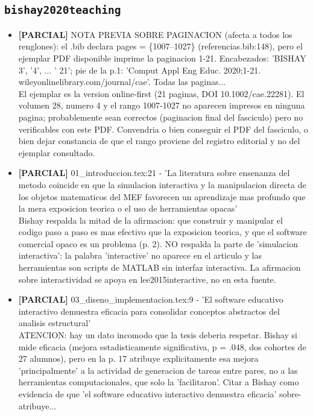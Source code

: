 \documentclass[11pt,a4paper]{article}
\newcommand{\campo}[1]{\textcolor{gris}{\footnotesize #1}}
\begin{document}
\subsection{\texttt{bishay2020teaching}}
\begin{itemize}\small
\item \textbf{[PARCIAL]} NOTA PREVIA SOBRE PAGINACION (afecta a todos los renglones): el .bib declara pages = \{1007--1027\} (referencias.bib:148), pero el ejemplar PDF disponible imprime la paginacion 1-21. Encabezados: 'BISHAY \textbar{}3', '4\textbar{}', ... '\textbar{} 21'; pie de la p.1: 'Comput Appl Eng Educ. 2020;1-21.  wileyonlinelibrary.com/journal/cae'. Todas las paginas...
\\ \campo{El ejemplar es la version online-first (21 paginas, DOI 10.1002/cae.22281). El volumen 28, numero 4 y el rango 1007-1027 no aparecen impresos en ninguna pagina; probablemente sean correctos (paginacion final del fasciculo) pero no verificables con este PDF. Convendria o bien conseguir el PDF del fasciculo, o bien dejar constancia de que el rango proviene del registro editorial y no del ejemplar consultado.}
\item \textbf{[PARCIAL]} 01\_introduccion.tex:21 - 'La literatura sobre ensenanza del metodo coincide en que la simulacion interactiva y la manipulacion directa de los objetos matematicos del MEF favorecen un aprendizaje mas profundo que la mera exposicion teorica o el uso de herramientas opacas'
\\ \campo{Bishay respalda la mitad de la afirmacion: que construir y manipular el codigo paso a paso es mas efectivo que la exposicion teorica, y que el software comercial opaco es un problema (p. 2). NO respalda la parte de 'simulacion interactiva': la palabra 'interactive' no aparece en el articulo y las herramientas son scripts de MATLAB sin interfaz interactiva. La afirmacion sobre interactividad se apoya en lee2015interactive, no en esta fuente.}
\item \textbf{[PARCIAL]} 03\_diseno\_implementacion.tex:9 - 'El software educativo interactivo demuestra eficacia para consolidar conceptos abstractos del analisis estructural'
\\ \campo{ATENCION: hay un dato incomodo que la tesis deberia respetar. Bishay si mide eficacia (mejora estadisticamente significativa, p = .048, dos cohortes de 27 alumnos), pero en la p. 17 atribuye explicitamente esa mejora 'principalmente' a la actividad de generacion de tareas entre pares, no a las herramientas computacionales, que solo la 'facilitaron'. Citar a Bishay como evidencia de que 'el software educativo interactivo demuestra eficacia' sobre-atribuye...}

\end{itemize}
\end{document}
